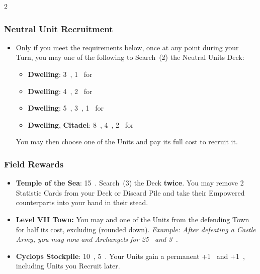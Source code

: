\begin{multicols}{2}
\subsubsection*{Neutral Unit Recruitment}

\begin{itemize}
  \item Only if you meet the requirements below, once at any point during your Turn, you may  one of the following to Search~(2) the Neutral Units Deck:
    \begin{itemize}
      \item {} \textbf{Dwelling}: 3~, 1~ for 
      \item {} \textbf{Dwelling}: 4~, 2~ for 
      \item {} \textbf{Dwelling}: 5~, 3~, 1~ for 
      \item {} \textbf{Dwelling}, \textbf{Citadel}: 8~, 4~, 2~ for 
    \end{itemize}
    You may then choose one of the Units  and pay its full cost to recruit it.
\end{itemize}

\subsubsection*{Field Rewards}

\begin{itemize}
  \item \textbf{Temple of the Sea}: 15~.
    Search~(3) the  Deck \textbf{twice}.
    You may remove 2 Statistic Cards from your Deck or Discard Pile and take their Empowered counterparts into your hand in their stead.
  \item \textbf{Level VII Town:} You may  and  one of the Units from the defending Town for half its cost, excluding  (rounded down). \textit{Example: After defeating a Castle Army, you may now  and  Archangels for 25~ and 3~.}
  \item \textbf{Cyclops Stockpile}: 10~, 5~. Your Units gain a permanent +1~ and +1~, including Units you Recruit later.
\end{itemize}


\end{multicols}
